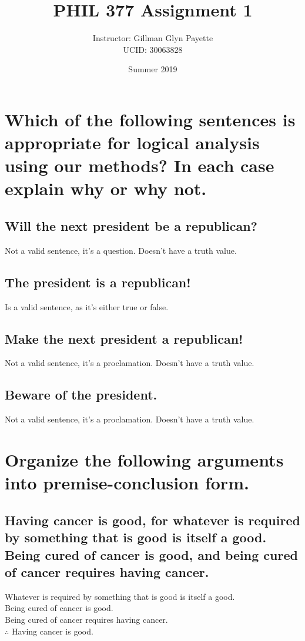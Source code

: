 \documentclass[10pt, letterpaper, titlepage]{article}
\title{PHIL 377 Assignment 1}
\author{Instructor: Gillman Glyn Payette
    \\UCID: 30063828}
\date{Summer 2019}
\begin{document}
    \maketitle
    \section{Which of the following sentences is appropriate for logical analysis using our methods?
        In each case explain why or why not.}
        \subsection{Will the next president be a republican?}
                Not a valid sentence, it's a question. Doesn't have a truth value.

        \subsection{The president is a republican!}
                Is a valid sentence, as it's either true or false.
        
        \subsection{Make the next president a republican!}
                Not a valid sentence, it's a proclamation. Doesn't have a truth value.

        \subsection{Beware of the president.}
                Not a valid sentence, it's a proclamation. Doesn't have a truth value.

    \section{Organize the following arguments into premise-conclusion form.}
        \subsection{Having cancer is good, for whatever is required by something that is good is itself
            a good. Being cured of cancer is good, and being cured of cancer requires having
            cancer.}
            Whatever is required by something that is good is itself a good. \\
            Being cured of cancer is good. \\
            Being cured of cancer requires having cancer. \\
            $\therefore$ Having cancer is good.
\end{document}
